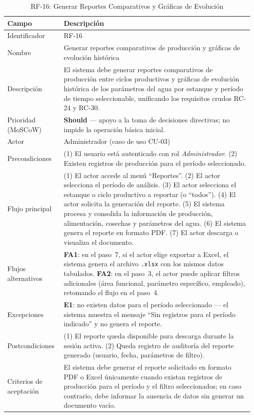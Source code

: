 \documentclass[12pt,a4paper]{article}
\begin{document}
\begin{table}[H]
\centering
\caption{RF-16: Generar Reportes Comparativos y Gráficas de Evolución}
\begin{tabular}{|p{3.6cm}|p{10.4cm}|}
\hline
\textbf{Campo} & \textbf{Descripción} \\
\hline
Identificador & RF-16 \\ \hline
Nombre & Generar reportes comparativos de producción y gráficas de evolución
histórica \\ \hline
Descripción & El sistema debe generar reportes comparativos de producción
entre ciclos productivos y gráficas de evolución histórica de los parámetros
del agua por estanque y período de tiempo seleccionable, unificando los
requisitos crudos RC-24 y RC-30. \\ \hline
Prioridad (MoSCoW) & \textbf{Should} --- apoyo a la toma de decisiones
directivas; no impide la operación básica inicial. \\ \hline
Actor & Administrador (caso de uso CU-03) \\ \hline
Precondiciones & (1) El usuario está autenticado con rol \textit{Administrador}.
(2) Existen registros de producción para el período seleccionado. \\ \hline
Flujo principal &
(1) El actor accede al menú ``Reportes''.
(2) El actor selecciona el período de análisis.
(3) El actor selecciona el estanque o ciclo productivo a reportar (o
``todos'').
(4) El actor solicita la generación del reporte.
(5) El sistema procesa y consolida la información de producción, alimentación,
cosechas y parámetros del agua.
(6) El sistema genera el reporte en formato PDF.
(7) El actor descarga o visualiza el documento. \\ \hline
Flujos alternativos & \textbf{FA1}: en el paso~7, si el actor elige exportar a
Excel, el sistema genera el archivo \texttt{.xlsx} con los mismos datos
tabulados. \textbf{FA2}: en el paso~3, el actor puede aplicar filtros
adicionales (área funcional, parámetro específico, empleado), retomando el
flujo en el paso~4. \\ \hline
Excepciones & \textbf{E1}: no existen datos para el período seleccionado ---
el sistema muestra el mensaje ``Sin registros para el período indicado'' y no
genera el reporte. \\ \hline
Postcondiciones & (1) El reporte queda disponible para descarga durante la
sesión activa. (2) Queda registro de auditoría del reporte generado (usuario,
fecha, parámetros de filtro). \\ \hline
Criterios de aceptación & El sistema debe generar el reporte solicitado en
formato PDF o Excel únicamente cuando existan registros de producción para el
período y el filtro seleccionados; en caso contrario, debe informar la
ausencia de datos sin generar un documento vacío. \\ \hline
\end{tabular}
\end{table}
\end{document}
